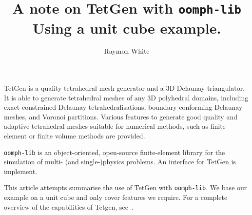 \documentclass[12pt,twoside,a4paper]{article}
\numberwithin{equation}{section}
\newcommand{\oomphlib}{\texttt{oomph-lib}}
\begin{document}
\title{A note on TetGen with \oomphlib{} \\Using a unit cube example.}
\author{Raymon White}
\maketitle

TetGen is a quality tetrahedral mesh generator and a 3D Delaunay
triangulator. It is able to generate tetrahedral meshes of any 3D polyhedral
domains, including exact constrained Delaunay tetrahedralisations, boundary
conforming Delaunay meshes, and Voronoi partitions. Various features to
generate good quality and adaptive tetrahedral meshes suitable for numerical
methods, such as finite element or finite volume methods are provided.

\oomphlib{} is an object-oriented, open-source finite-element library for
the simulation of multi- (and single-)physics problems. An interface for
TetGen is implement.

This article attempts summarise the use of TetGen with \oomphlib{}.
We base our example on a unit cube and only cover features we require.
For a complete overview of the capabilities of Tetgen, see~\cite{Si2013}.
\end{document}
